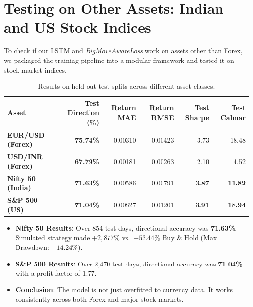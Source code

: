 \section{Testing on Other Assets: Indian and US Stock Indices}

To check if our LSTM and \textit{BigMoveAwareLoss} work on assets other than Forex, we packaged the training pipeline into a modular framework and tested it on stock market indices.

\begin{table}[htbp]
\centering
\caption{Results on held-out test splits across different asset classes.}
\label{tab:cross-asset}
\small
\begin{tabular}{lrrrrr}
\toprule
\textbf{Asset} & \textbf{Test Direction (\%)} & \textbf{Return MAE} & \textbf{Return RMSE} & \textbf{Test Sharpe} & \textbf{Test Calmar} \\
\midrule
\textbf{EUR/USD (Forex)} & \textbf{75.74\%} & 0.00310 & 0.00423 & 3.73 & 18.48 \\
\textbf{USD/INR (Forex)} & \textbf{67.79\%} & 0.00181 & 0.00263 & 2.10 & 4.52 \\
\textbf{Nifty 50 (India)} & \textbf{71.63\%} & 0.00586 & 0.00791 & \textbf{3.87} & \textbf{11.82} \\
\textbf{S\&P 500 (US)} & \textbf{71.04\%} & 0.00827 & 0.01201 & \textbf{3.91} & \textbf{18.94} \\
\bottomrule
\end{tabular}
\end{table}

\begin{itemize}[leftmargin=1.5cm, itemsep=1pt]
	\item \textbf{Nifty 50 Results:} Over 854 test days, directional accuracy was \textbf{71.63\%}. Simulated strategy made $+2,877\%$ vs.\ $+53.44\%$ Buy \& Hold (Max Drawdown: $-14.24\%$).
	\item \textbf{S\&P 500 Results:} Over 2,470 test days, directional accuracy was \textbf{71.04\%} with a profit factor of 1.77.
	\item \textbf{Conclusion:} The model is not just overfitted to currency data. It works consistently across both Forex and major stock markets.
\end{itemize}

